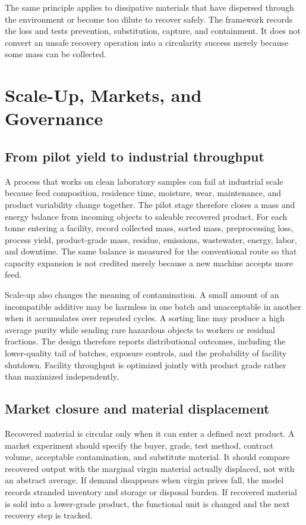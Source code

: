 \documentclass[conference]{IEEEtran}
\begin{document}
The same principle applies to dissipative materials that have dispersed through the environment or become too dilute to recover safely. The framework records the loss and tests prevention, substitution, capture, and containment. It does not convert an unsafe recovery operation into a circularity success merely because some mass can be collected.

\section{Scale-Up, Markets, and Governance}

\subsection{From pilot yield to industrial throughput}

A process that works on clean laboratory samples can fail at industrial scale because feed composition, residence time, moisture, wear, maintenance, and product variability change together. The pilot stage therefore closes a mass and energy balance from incoming objects to saleable recovered product. For each tonne entering a facility, record collected mass, sorted mass, preprocessing loss, process yield, product-grade mass, residue, emissions, wastewater, energy, labor, and downtime. The same balance is measured for the conventional route so that capacity expansion is not credited merely because a new machine accepts more feed.

Scale-up also changes the meaning of contamination. A small amount of an incompatible additive may be harmless in one batch and unacceptable in another when it accumulates over repeated cycles. A sorting line may produce a high average purity while sending rare hazardous objects to workers or residual fractions. The design therefore reports distributional outcomes, including the lower-quality tail of batches, exposure controls, and the probability of facility shutdown. Facility throughput is optimized jointly with product grade rather than maximized independently.

\subsection{Market closure and material displacement}

Recovered material is circular only when it can enter a defined next product. A market experiment should specify the buyer, grade, test method, contract volume, acceptable contamination, and substitute material. It should compare recovered output with the marginal virgin material actually displaced, not with an abstract average. If demand disappears when virgin prices fall, the model records stranded inventory and storage or disposal burden. If recovered material is sold into a lower-grade product, the functional unit is changed and the next recovery step is tracked.
\end{document}
